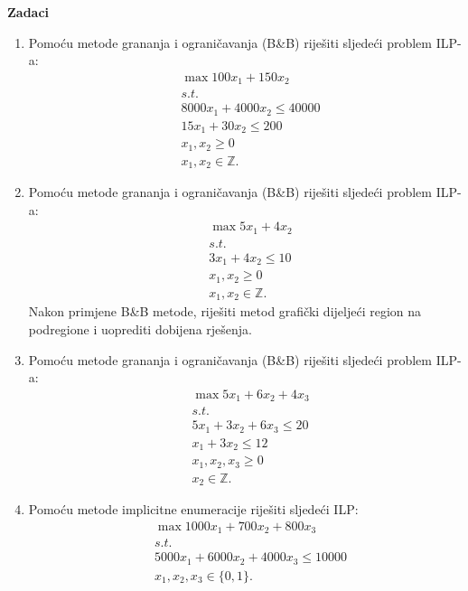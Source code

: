 \documentclass[a4paper, utf8, 11pt, colorlinks]{book}
\begin{document}
 \textbf{\large Zadaci}
 \begin{enumerate}
 	\item %
 	Pomoću metode grananja i ograničavanja (B\&B) riješiti sljedeći problem ILP-a:
 	\begin{align*}
 		&\max 100 x_1 + 150 x_2 \\
 		& s.t. \\
 		& 8000 x_1 + 4000 x_2 \leq 40 000 \\
 		& 15 x_1 + 30 x_2 \leq 200 \\
 		& x_1, x_2 \geq 0 \\
 		& x_1, x_2 \in \mathbb{Z}.
 	\end{align*}
   \item %
   	Pomoću metode grananja i ograničavanja  (B\&B) riješiti sljedeći problem ILP-a:
   \begin{align*}
   	    &\max 5 x_1 + 4 x_2 \\
   	    & s.t. \\
   	    & 3 x_1 + 4 x_2 \leq 10 \\
   	    & x_1, x_2 \geq 0 \\
   	    & x_1, x_2 \in \mathbb{Z}.
   \end{align*}
Nakon primjene B\&B metode, riješiti metod grafički dijeljeći region na podregione i uoprediti dobijena rješenja. 
\item 	Pomoću metode grananja i ograničavanja  (B\&B) riješiti sljedeći problem ILP-a:
\begin{align*}
	 &\max 5x_1 + 6 x_2 + 4 x_3 \\
	 &s.t. \\
	 & 5x_1 + 3 x_2 + 6 x_3 \leq 20 \\
	 & x_1 + 3x_2 \leq 12 \\
	 & x_1,x_2, x_3 \geq 0 \\
	 & x_2 \in \mathbb{Z}.
\end{align*}
\item %
 Pomoću metode implicitne enumeracije riješiti sljedeći ILP:
\begin{align*}
  &\max 1000 x_1 + 700 x_2 + 800 x_3 \\
  &s.t. \\
  & 5000 x_1 + 6000 x_2 + 4000 x_3 \leq 10000 \\
  & x_1, x_2, x_3 \in \{0, 1\}.

\end{align*}
\end{enumerate}
\end{document}
